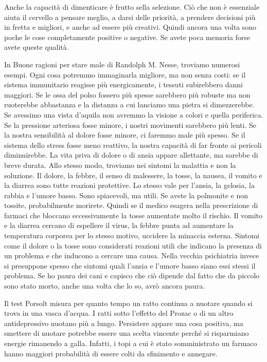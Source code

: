 \documentclass[12pt]{book} %
\begin{document}
\begin{mdframed}[linewidth=1pt]
Anche la capacità di dimenticare è frutto sella selezione. Ciò che non è essenziale aiuta il cervello a pensare meglio,
a darsi delle priorità, a prendere decisioni più in fretta e migliori, e anche ad essere più creativi. Quindi ancora
una volta sono poche le cose completamente positive o negative. Se avete poca memoria forse avete queste qualità.

In Buone ragioni per stare male di Randolph M. Nesse, troviamo numerosi
esempi. Ogni cosa potremmo immaginarla migliore, ma non senza costi: se il sistema immunitario reagisse più
energicamente, i tessuti subirebbero danni maggiori. Se le ossa del polso fossero più spesse sarebbero più robuste ma
non ruoterebbe abbastanza e la distanza a cui lanciamo una pietra si dimezzerebbe. Se avessimo una vista
d'aquila non avremmo la visione a colori e quella periferica. Se la pressione arteriosa fosse
minore, i nostri movimenti sarebbero più lenti. Se la nostra sensibilità al dolore fosse minore, ci faremmo male più
spesso. Se il sistema dello stress fosse meno reattivo, la nostra capacità di far fronte ai pericoli diminuirebbe. La
vita priva di dolore o di ansia appare allettante, ma sarebbe di breve durata.\newline
\newline
Allo stesso modo, troviamo nei sintomi la malattia e non la soluzione. Il dolore, la febbre, il senso di malessere, la
tosse, la nausea, il vomito e la diarrea sono tutte reazioni protettive. Lo stesso vale per
l'ansia, la gelosia, la rabbia e l'umore basso. Sono spiacevoli, ma utili. Se
avete la polmonite e non tossite, probabilmente morirete. Quindi se il medico esagera nella prescrizione di farmaci che
bloccano eccessivamente la tosse aumentate molto il rischio. Il vomito e la diarrea cercano di espellere il virus, la
febbre punta ad aumentare la temperatura corporea per lo stesso motivo, uccidere la minaccia esterna. Sintomi come il
dolore o la tosse sono considerati reazioni utili che indicano la presenza di un problema e che inducono a cercare una
causa. Nella vecchia psichiatria invece si presuppone spesso che sintomi quali l'ansia e
l'umore basso siano essi stessi il problema. Se ho paura dei cani e capisco che ciò dipende dal
fatto che da piccolo sono stato morto, anche una volta che lo so, avrò ancora paura.

Il test Porsolt misura per quanto tempo un ratto continua a nuotare quando si trova in una vasca
d'acqua. I ratti sotto l'effetto del Prozac o di un altro antidepressivo
nuotano più a lungo. Persistere appare una cosa positiva, ma smettere di nuotare potrebbe essere una scelta vincente
perché si risparmiano energie rimanendo a galla. Infatti, i topi a cui è stato somministrato un farmaco hanno maggiori
probabilità di essere colti da sfinimento e annegare. 


\end{mdframed}
\end{document}
